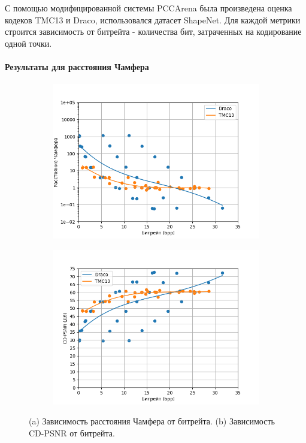 \documentclass[a4paper,12pt]{extreport}
\begin{document}
С помощью модифицированной системы PCCArena была произведена оценка кодеков
TMC13 и Draco, использовался датасет ShapeNet. Для каждой метрики строится
зависимость от битрейта - количества бит, затраченных на кодирование одной
точки.

\paragraph{Результаты для расстояния Чамфера}

\begin{figure}[H]
    \centering
    \begin{subfigure}{0.49\textwidth}
        \includegraphics[width=\linewidth]{assets/approx_cd_p2pt.png}
        \caption{}
    \end{subfigure}
    \begin{subfigure}{0.49\textwidth}
        \includegraphics[width=\linewidth]{assets/approx_cdpsnr_p2pt.png}
        \caption{}
    \end{subfigure}
    \caption{ (a) Зависимость расстояния Чамфера от битрейта. (b) Зависимость
    CD-PSNR от битрейта. }
    \label{img:pcc_arena_cd_bpp}
\end{figure}
\end{document}
